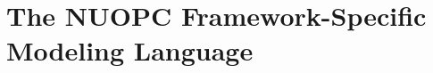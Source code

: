 \documentclass[oneside,11pt]{memoir}
\begin{document}
%





\section{The NUOPC Framework-Specific Modeling Language}

\end{document}
